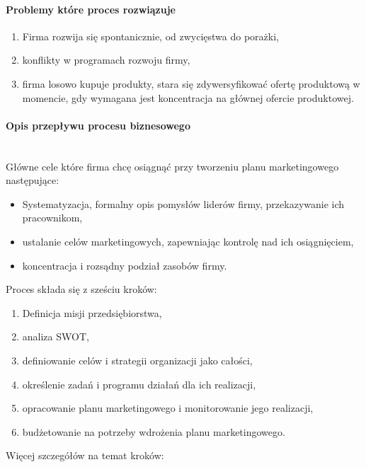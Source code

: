 \documentclass[a4paper, 12pt]{article}
\begin{document}
\paragraph{Problemy które proces rozwiązuje}
\begin{enumerate}
	\item Firma rozwija się spontanicznie, od zwycięstwa do porażki,
	\item konflikty w programach rozwoju firmy,
	\item firma losowo kupuje produkty, stara się zdywersyfikować ofertę produktową w momencie, gdy wymagana jest koncentracja na głównej ofercie produktowej.
\end{enumerate} 
\newpage
\paragraph{Opis przepływu procesu biznesowego}\mbox{}\\
\hspace*{1 cm} Główne cele które firma chcę osiągnąć przy tworzeniu planu marketingowego następujące:
\begin{itemize}
	\item Systematyzacja, formalny opis pomysłów liderów firmy, przekazywanie ich pracownikom,
	\item ustalanie celów marketingowych, zapewniając kontrolę nad ich osiągnięciem,
	\item koncentracja i rozsądny podział zasobów firmy.
\end{itemize} 
\hspace*{1 cm} Proces składa się z sześciu kroków:
\begin{enumerate}
	\item Definicja misji przedsiębiorstwa,
	\item analiza SWOT,
	\item definiowanie celów i strategii organizacji jako całości,
	\item określenie zadań i programu działań dla ich realizacji,
	\item opracowanie planu marketingowego i monitorowanie jego realizacji,
	\item budżetowanie na potrzeby wdrożenia planu marketingowego.
\end{enumerate}
Więcej szczegółów na temat kroków:
\end{document}
